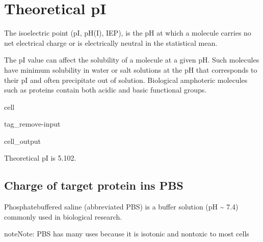 \documentclass[letterpaper,10pt,english]{jupyterBook}
\begin{document}
\section{Theoretical pI}
\label{\detokenize{ipynb/chapter1:theoretical-pi}}
\sphinxAtStartPar
The isoelectric point (pI, pH(I), IEP), is the pH at which a molecule carries no net electrical charge or is electrically neutral in the statistical mean.

\sphinxAtStartPar
The pI value can affect the solubility of a molecule at a given pH. Such molecules have minimum solubility in water or salt solutions at the pH that corresponds to their pI and often precipitate out of solution. Biological amphoteric molecules such as proteins contain both acidic and basic functional groups.

\begin{sphinxuseclass}{cell}
\begin{sphinxuseclass}{tag_remove-input}\begin{sphinxVerbatimOutput}

\begin{sphinxuseclass}{cell_output}
\begin{sphinxVerbatim}[commandchars=\\\{\}]
Theoretical pI is 5.102.
\end{sphinxVerbatim}

\end{sphinxuseclass}\end{sphinxVerbatimOutput}

\end{sphinxuseclass}
\end{sphinxuseclass}

\subsection{Charge of target protein ins PBS}
\label{\detokenize{ipynb/chapter1:charge-of-target-protein-ins-pbs}}
\sphinxAtStartPar
Phosphate\sphinxhyphen{}buffered saline (abbreviated PBS) is a buffer solution (pH \textasciitilde{} 7.4) commonly used in biological research.

\begin{sphinxadmonition}{note}{Note:}
\sphinxAtStartPar
PBS has many uses because it is isotonic and non\sphinxhyphen{}toxic to most cells
\end{sphinxadmonition}
\end{document}
